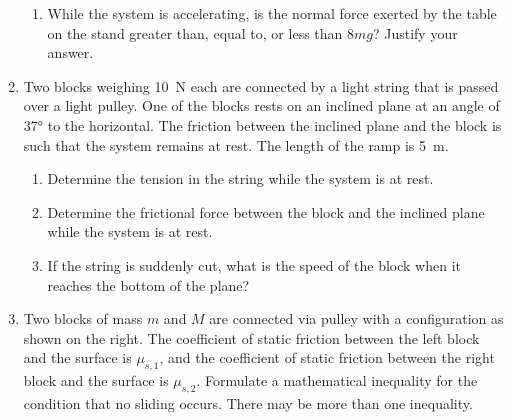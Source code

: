 \documentclass{../../oss-apphys}
\begin{document}
\begin{enumerate}[leftmargin=15pt]
\begin{enumerate}[leftmargin=18pt]
  \item While the system is accelerating, is the normal force exerted by the
    table on the stand greater than, equal to, or less than $8mg$? Justify your
    answer.
  \end{enumerate}
  \newpage
\item Two blocks weighing \SI{10}{\newton} each are connected by a light string
  that is passed over a light pulley. One of the blocks rests on an inclined
  plane at an angle of \ang{37} to the horizontal. The friction between the
  inclined plane and the block is such that the system remains at rest. The
  length of the ramp is \SI{5}{\metre}.
  \begin{enumerate}[leftmargin=18pt]
  \item Determine the tension in the string while the system is at rest.
  \item Determine the frictional force between the block and the inclined plane
    while the system is at rest.
  \item If the string is suddenly cut, what is the speed of the block when it
    reaches the bottom of the plane?
  \end{enumerate}
  \newpage
\item  Two blocks of mass $m$ and $M$ are connected via pulley with a
  configuration as shown on the right. The coefficient of static friction
  between the left block and the surface is $\mu_{s,1}$, and the coefficient of
  static friction between the right block and the surface is $\mu_{s,2}$.
  Formulate a mathematical inequality for the condition that no sliding occurs.
  There may be more than one inequality.
  \begin{center}
  \end{center}
\end{enumerate}
\end{document}
